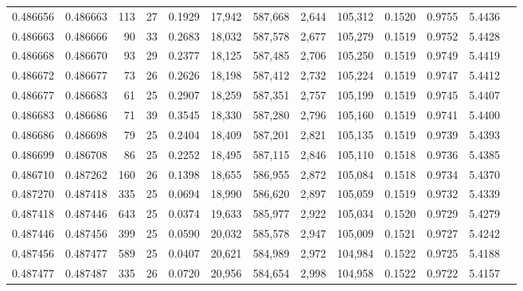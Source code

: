 \begin{tabular}{rrrrrrrrrrrrr}
0.486656 & 0.486663 & 113 &  27 &                                     0.1929 &  17,942 & 587,668 &   2,644 & 105,312 & 0.1520 & 0.9755 & 5.4436 \\
0.486663 & 0.486666 &  90 &  33 &                                     0.2683 &  18,032 & 587,578 &   2,677 & 105,279 & 0.1519 & 0.9752 & 5.4428 \\
0.486668 & 0.486670 &  93 &  29 &                                     0.2377 &  18,125 & 587,485 &   2,706 & 105,250 & 0.1519 & 0.9749 & 5.4419 \\
0.486672 & 0.486677 &  73 &  26 &                                     0.2626 &  18,198 & 587,412 &   2,732 & 105,224 & 0.1519 & 0.9747 & 5.4412 \\
0.486677 & 0.486683 &  61 &  25 &                                     0.2907 &  18,259 & 587,351 &   2,757 & 105,199 & 0.1519 & 0.9745 & 5.4407 \\
0.486683 & 0.486686 &  71 &  39 &                                     0.3545 &  18,330 & 587,280 &   2,796 & 105,160 & 0.1519 & 0.9741 & 5.4400 \\
0.486686 & 0.486698 &  79 &  25 &                                     0.2404 &  18,409 & 587,201 &   2,821 & 105,135 & 0.1519 & 0.9739 & 5.4393 \\
0.486699 & 0.486708 &  86 &  25 &                                     0.2252 &  18,495 & 587,115 &   2,846 & 105,110 & 0.1518 & 0.9736 & 5.4385 \\
0.486710 & 0.487262 & 160 &  26 &                                     0.1398 &  18,655 & 586,955 &   2,872 & 105,084 & 0.1518 & 0.9734 & 5.4370 \\
0.487270 & 0.487418 & 335 &  25 &                                     0.0694 &  18,990 & 586,620 &   2,897 & 105,059 & 0.1519 & 0.9732 & 5.4339 \\
0.487418 & 0.487446 & 643 &  25 &                                     0.0374 &  19,633 & 585,977 &   2,922 & 105,034 & 0.1520 & 0.9729 & 5.4279 \\
0.487446 & 0.487456 & 399 &  25 &                                     0.0590 &  20,032 & 585,578 &   2,947 & 105,009 & 0.1521 & 0.9727 & 5.4242 \\
0.487456 & 0.487477 & 589 &  25 &                                     0.0407 &  20,621 & 584,989 &   2,972 & 104,984 & 0.1522 & 0.9725 & 5.4188 \\
0.487477 & 0.487487 & 335 &  26 &                                     0.0720 &  20,956 & 584,654 &   2,998 & 104,958 & 0.1522 & 0.9722 & 5.4157 \\

\end{tabular}
